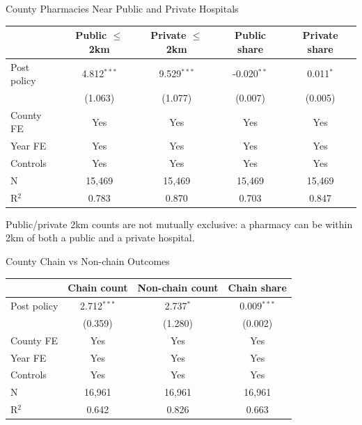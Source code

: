 \documentclass{beamer}
\begin{document}
\begin{frame}{County Pharmacies Near Public and Private Hospitals}

\centering
\scriptsize
\setlength{\tabcolsep}{5pt}

\begin{tabular}{lcccc}
\toprule
& Public $\leq$2km & Private $\leq$2km & Public share & Private share \\
\midrule
Post policy
& 4.812$^{***}$ & 9.529$^{***}$ & -0.020$^{**}$ & 0.011$^{*}$ \\
& (1.063) & (1.077) & (0.007) & (0.005) \\
\midrule
County FE & Yes & Yes & Yes & Yes \\
Year FE & Yes & Yes & Yes & Yes \\
Controls & Yes & Yes & Yes & Yes \\
\midrule
N & 15,469 & 15,469 & 15,469 & 15,469 \\
R$^2$ & 0.783 & 0.870 & 0.703 & 0.847 \\
\bottomrule
\end{tabular}

\vspace{0.6em}
\raggedright
\tiny Public/private 2km counts are not mutually exclusive: a pharmacy can be within 2km of both a public and a private hospital.

\end{frame}

\begin{frame}{County Chain vs Non-chain Outcomes}

\centering
\scriptsize
\setlength{\tabcolsep}{7pt}

\begin{tabular}{lccc}
\toprule
& Chain count & Non-chain count & Chain share \\
\midrule
Post policy
& 2.712$^{***}$ & 2.737$^{*}$ & 0.009$^{***}$ \\
& (0.359) & (1.280) & (0.002) \\
\midrule
County FE & Yes & Yes & Yes \\
Year FE & Yes & Yes & Yes \\
Controls & Yes & Yes & Yes \\
\midrule
N & 16,961 & 16,961 & 16,961 \\
R$^2$ & 0.642 & 0.826 & 0.663 \\
\bottomrule
\end{tabular}

\end{frame}
\end{document}
